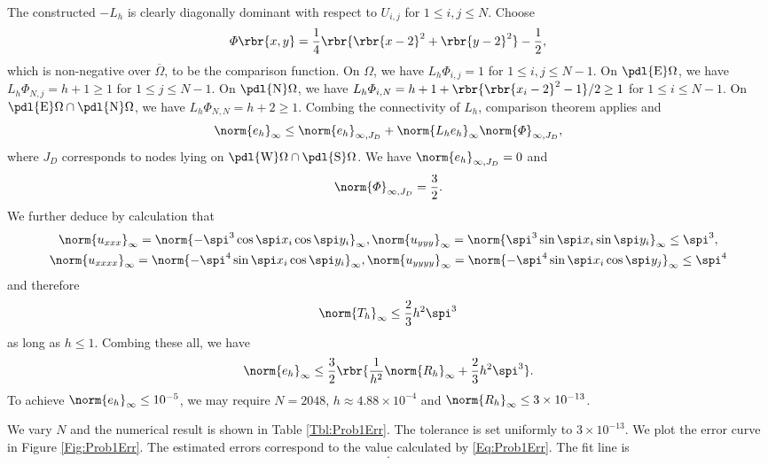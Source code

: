 \documentclass[english, nochinese]{pnote}
\newcommand\normi[1]{\norm{#1}_{\infty}}
\begin{document}
The constructed $-L_h$ is clearly diagonally dominant with respect to $ U_{ i, j } $ for $ 1 \le i, j \le N $. Choose
\begin{equation}
\varPhi \rbr{ x, y } = \frac{1}{4} \rbr{ \rbr{ x - 2 }^2 + \rbr{ y - 2 }^2 } - \frac{1}{2},
\end{equation}
which is non-negative over $\overline{\Omega}$, to be the comparison function. On $\Omega$, we have $ L_h \varPhi_{ i, j } = 1 $ for $ 1 \le i, j \le N - 1 $. On $ \pdl{\text{E}} \Omega $, we have $ L_h \varPhi_{ N, j } = h + 1 \ge 1 $ for $ 1 \le j \le N - 1 $. On $ \pdl{\text{N}} \Omega $, we have $ L_h \varPhi_{ i, N } = h + 1 + \rbr{ \rbr{ x_i - 2 }^2 - 1 } / 2 \ge 1 $ for $ 1 \le i \le N - 1 $.
On $ \pdl{\text{E}} \Omega \cap \pdl{\text{N}} \Omega $, we have $ L_h \varPhi_{ N, N } = h + 2 \ge 1 $. Combing the connectivity of $L_h$, comparison theorem applies and
\begin{equation}
\normi{e_h} \le \norm{e_h}_{ \infty, J_D } + \normi{ L_h e_h } \norm{\varPhi}_{ \infty, J_D },
\end{equation}
where $J_D$ corresponds to nodes lying on $ \pdl{\text{W}} \Omega \cap \pdl{\text{S}} \Omega $. We have $ \norm{e_h}_{ \infty, J_D } = 0 $ and
\begin{equation}
\norm{\varPhi}_{ \infty, J_D } = \frac{3}{2}.
\end{equation}
We further deduce by calculation that
\begin{gather}
\normi{u_{ x x x }} = \normi{ -\spi^3 \cos \spi x_i \cos \spi y_i }, \normi{u_{ y y y }} = \normi{ \spi^3 \sin \spi x_i \sin \spi y_i } \le \spi^3, \\
\normi{u_{ x x x x }} = \normi{ -\spi^4 \sin \spi x_i \cos \spi y_i }, \normi{u_{ y y y y }} = \normi{ -\spi^4 \sin \spi x_i \cos \spi y_j } \le \spi^4
\end{gather}
and therefore
\begin{equation}
\normi{T_h} \le \frac{2}{3} h^2 \spi^3
\end{equation}
as long as $ h \le 1 $.
Combing these all, we have
\begin{equation} \label{Eq:Prob1Err}
\normi{e_h} \le \frac{3}{2} \rbr{ \frac{1}{h^2} \normi{R_h} + \frac{2}{3} h^2 \spi^3 }.
\end{equation}
To achieve $ \normi{e_h} \le 10^{-5} $, we may require $ N = 2048 $, $ h \approx 4.88 \times 10^{-4} $ and $ \normi{R_h} \le 3 \times 10^{-13} $.

We vary $N$ and the numerical result is shown in Table \ref{Tbl:Prob1Err}. The tolerance is set uniformly to $ 3 \times 10^{-13} $. We plot the error curve in Figure \ref{Fig:Prob1Err}. The estimated errors correspond to the value calculated by \eqref{Eq:Prob1Err}. The fit line is
\begin{equation}
.
\end{equation}
\end{document}
